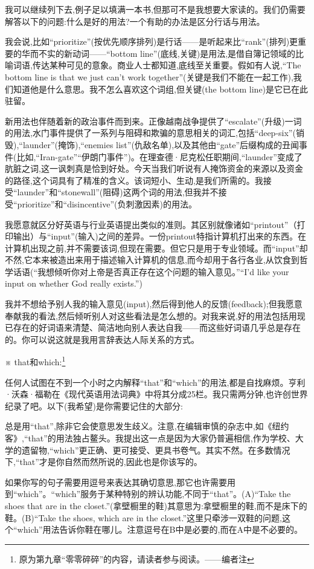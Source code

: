 我可以继续列下去,例子足以填满一本书,但那可不是我想要大家读的。我们仍需要解答以下的问题:什么是好的用法?一个有助的办法是区分行话与用法。

我会说,比如“prioritize”(按优先顺序排列)是行话——是听起来比“rank”(排列)更重要的华而不实的新动词——“bottom line”(底线,关键)是用法,是借自簿记领域的比喻词语,传达某种可见的意象。商业人士都知道,底线至关重要。假如有人说,“The bottom line is that we just can’t work together”(关键是我们不能在一起工作),我们知道他是什么意思。我不怎么喜欢这个词组,但关键(the bottom line)是它已在此驻留。

新用法也伴随着新的政治事件而到来。正像越南战争提供了“escalate”(升级)一词的用法,水门事件提供了一系列与阻碍和欺骗的意思相关的词汇,包括“deep-six”(销毁),“launder”(掩饰),“enemies list”(仇敌名单),以及其他由“gate”后缀构成的丑闻事件(比如,“Iran-gate”“伊朗门事件”)。在理查德·尼克松任职期间,“launder”变成了肮脏之词,这一讽刺真是恰到好处。今天当我们听说有人掩饰资金的来源以及资金的路径,这个词具有了精准的含义。该词短小、生动,是我们所需的。我接受“launder”和“stonewall”(阻碍)这两个词的用法,但我并不接受“prioritize”和“disincentive”(负刺激因素)的用法。

我愿意就区分好英语与行业英语提出类似的准则。其区别就像诸如“printout”（打印输出）与“input”(输入)之间的差异。一份printout特指计算机打出来的东西。在计算机出现之前,并不需要该词,但现在需要。但它只是用于专业领域。而“input”却不然,它本来被造出来用于描述输入计算机的信息,而今却用于各行各业,从饮食到哲学话语(“我想倾听你对上帝是否真正存在这个问题的输入意见。”“I’d like your input on whether God really exists.”)

我并不想给予别人我的输入意见(input),然后得到他人的反馈(feedback);但我愿意奉献我的看法,然后倾听别人对这些看法是怎么想的。对我来说,好的用法包括用现已存在的好词语来清楚、简洁地向别人表达自我——而这些好词语几乎总是存在的。你可以说这就是我用言辞表达人际关系的方式。

※ that和which:\footnote{原为第九章“零零碎碎”的内容，请读者参与阅读。——编者注}

任何人试图在不到一个小时之内解释“that”和“which”的用法,都是自找麻烦。亨利·沃森·福勒在《现代英语用法词典》中将其分成25栏。我只需两分钟,也许创世界纪录了吧。以下(我希望)是你需要记住的大部分:

总是用“that”,除非它会使意思发生歧义。注意,在编辑审慎的杂志中,如《纽约客》,“that”的用法独占鳌头。我提出这一点是因为大家仍普遍相信,作为学校、大学的遗留物,“which”更正确、更可接受、更具书卷气。其实不然。在多数情况下,“that”才是你自然而然所说的,因此也是你该写的。

如果你写的句子需要用逗号来表达其确切意思,那它也许需要用到“which”。“which”服务于某种特别的辨认功能,不同于“that”。(A)“Take the shoes that are in the closet.”(拿壁橱里的鞋)其意思为:拿壁橱里的鞋,而不是床下的鞋。(B)“Take the shoes, which are in the closet.”这里只牵涉一双鞋的问题,这个“which”用法告诉你鞋在哪儿。注意逗号在B中是必要的,而在A中是不必要的。

